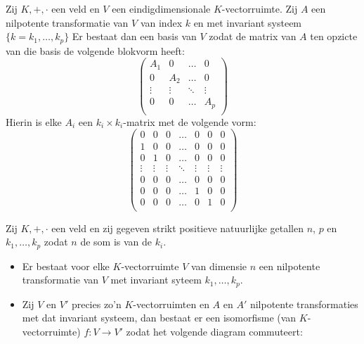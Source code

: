 \documentclass[main.tex]{subfiles}
\begin{document}
\begin{gev}
  \examen
  Zij $K,+,\cdot$ een veld en $V$ een eindigdimensionale $K$-vectorruimte.
  Zij $A$ een nilpotente transformatie van $V$ van index $k$ en met invariant systeem $\{k =k_{1},\dotsc,k_{p}\}$
  Er bestaat dan een basis van $V$ zodat de matrix van $A$ ten opzicte van die basis de volgende blokvorm heeft:
  \[ 
  \begin{pmatrix}
    A_{1} & 0 & \hdots & 0\\
    0 & A_{2} & \hdots & 0\\
    \vdots & \vdots & \ddots & \vdots\\
    0 & 0 & \hdots & A_{p}\\
  \end{pmatrix}
  \]
  Hierin is elke $A_{i}$ een $k_{i}\times k_{i}$-matrix met de volgende vorm:
  \[ 
  \begin{pmatrix}
    0 & 0 & 0 & \hdots & 0 & 0 & 0\\
    1 & 0 & 0 & \hdots & 0 & 0 & 0\\
    0 & 1 & 0 & \hdots & 0 & 0 & 0\\
    \vdots & \vdots & \vdots & \ddots & \vdots & \vdots & \vdots\\
    0 & 0 & 0 & \hdots & 0 & 0 & 0\\
    0 & 0 & 0 & \hdots & 1 & 0 & 0\\
    0 & 0 & 0 & \hdots & 0 & 1 & 0\\
  \end{pmatrix}
  \]
\end{gev}

\begin{pr}
  Zij $K,+,\cdot$ een veld en zij gegeven strikt positieve natuurlijke getallen $n$, $p$ en $k_{1}, \dotsc, k_{p}$ zodat $n$ de som is van de $k_{i}$.
  \begin{itemize}
  \item Er bestaat voor elke $K$-vectorruimte $V$ van dimensie $n$ een nilpotente transformatie van $V$ met invariant syteem $k_{1}, \dotsc, k_{p}$.
  \item Zij $V$ en $V'$ precies zo'n $K$-vectorruimten en $A$ en $A'$ nilpotente transformaties met dat invariant systeem, dan bestaat er een isomorfisme (van $K$-vectorruimte) $f: V\rightarrow V'$ zodat het volgende diagram commuteert:
    \begin{figure}[H]
      \centering
    \end{figure}
  \end{itemize}
\end{pr}
\end{document}
